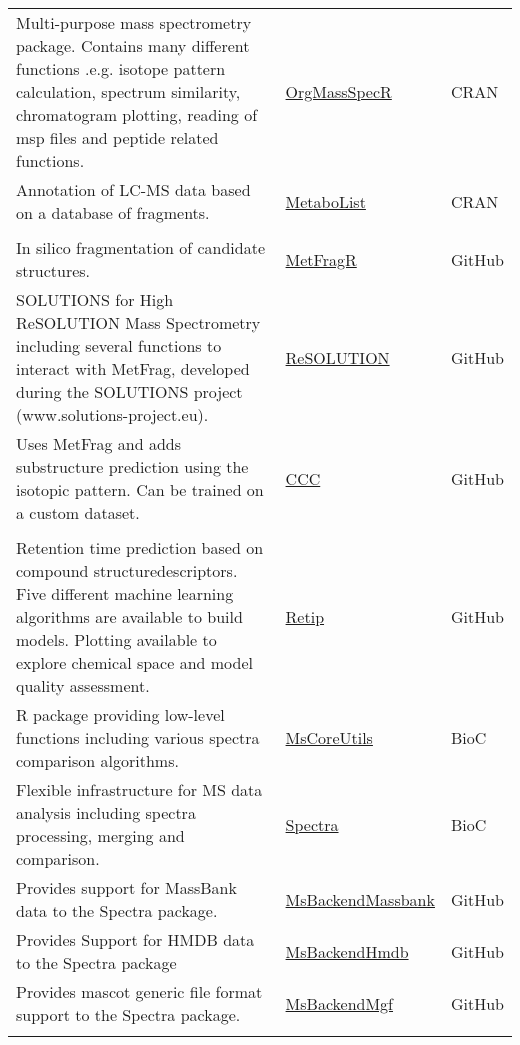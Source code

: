 \documentclass[]{article}
\begin{document}
\begin{longtable}[t]{>{\raggedright\arraybackslash}p{30em}>{\raggedright\arraybackslash}p{10em}>{\raggedright\arraybackslash}p{3em}}
Multi-purpose mass spectrometry package. Contains many different functions .e.g. isotope pattern calculation, spectrum similarity, chromatogram plotting, reading of msp files and peptide related functions. & \href{https://cran.r-project.org/package=OrgMassSpecR}{OrgMassSpecR} & CRAN\\
\rowcolor{gray!6}  Annotation of LC-MS data based on a database of fragments. & \href{https://cran.r-project.org/package=MetaboList}{MetaboList} & CRAN\\
\addlinespace[0.3em]
\multicolumn{3}{l}{\textbf{In silico fragmentation}}\\
In silico fragmentation of candidate structures. & \href{https://github.com/c-ruttkies/MetFragR}{MetFragR} & GitHub\\
\rowcolor{gray!6}  SOLUTIONS for High ReSOLUTION Mass Spectrometry including several functions to interact with MetFrag, developed during the SOLUTIONS project (www.solutions-project.eu). & \href{https://github.com/schymane/ReSOLUTION}{ReSOLUTION} & GitHub\\
Uses MetFrag and adds substructure prediction using the isotopic pattern. Can be trained on a custom dataset. & \href{https://github.com/lucanard/CCC}{CCC} & GitHub\\
\rowcolor{gray!6}  \addlinespace[0.3em]
\multicolumn{3}{l}{\textbf{Retention time correction}}\\
Retention time prediction based on compound structuredescriptors. Five different machine learning algorithms are available to build models. Plotting available to explore chemical space and model quality assessment. & \href{https://github.com/PaoloBnn/Retip}{Retip} & GitHub\\
R package providing low-level functions including various spectra comparison algorithms. & \href{https://doi.org/doi:10.18129/B9.bioc.MsCoreUtils}{MsCoreUtils} & BioC\\
\rowcolor{gray!6}  Flexible infrastructure for MS data analysis including spectra processing, merging and comparison. & \href{https://doi.org/doi:10.18129/B9.bioc.Spectra}{Spectra} & BioC\\
Provides support for MassBank data to the Spectra package. & \href{https://github.com/michaelwitting/MsBackendMassBank}{MsBackendMassbank} & GitHub\\
\rowcolor{gray!6}  Provides Support for HMDB data to the Spectra package & \href{https://github.com/RforMassSpectrometry/MsBackendHmdb}{MsBackendHmdb} & GitHub\\
Provides mascot generic file format support to the Spectra package. & \href{https://github.com/RforMassSpectrometry/MsBackendMgf}{MsBackendMgf} & GitHub\\*
\end{longtable}
\end{document}
